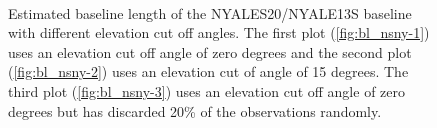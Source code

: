 \documentclass[twoside=semi,fontsize=12pt,paper=a4,titlepage=on]{kv_article}
\begin{document}
\begin{figure}\ContinuedFloat
	 \\
    \caption{Estimated baseline length of the NYALES20/NYALE13S baseline with different elevation cut off angles. The first plot (\ref{fig:bl_nsny-1}) uses an
    elevation cut off angle of zero degrees and the second plot (\ref{fig:bl_nsny-2}) uses an elevation cut of angle of 15 degrees. The third plot (\ref{fig:bl_nsny-3})
    uses an elevation cut off angle of zero degrees but has discarded 20\% of the observations randomly.}
	\label{fig:bl_nsny}
\end{figure}
\end{document}

